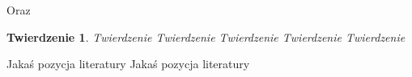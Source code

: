 \documentclass[twoside]{projektInzynierskiMS1}
\newtheorem{tw}{Twierdzenie}%
\begin{document}
\noindent
Oraz 

\bigskip

\vrule\hspace{10pt}\begin{minipage}{10cm}
\end{minipage}

\begin{tw}
Twierdzenie Twierdzenie Twierdzenie Twierdzenie Twierdzenie 
\end{tw}
\begin{thebibliography}{12}

 Jakaś pozycja literatury
 Jakaś pozycja literatury

\end{thebibliography}
\end{document}
